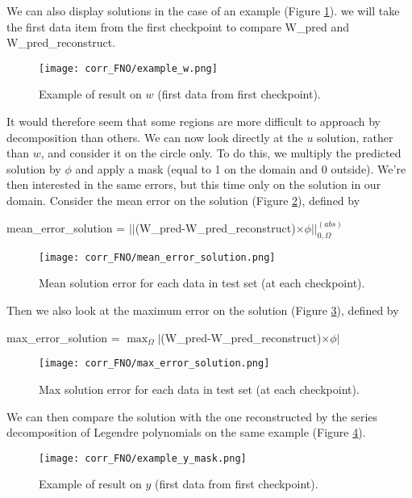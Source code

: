 We can also display solutions in the case of an example (Figure \ref{example_w}). we will take the first data item from the first checkpoint to compare W\_pred and W\_pred\_reconstruct.

\begin{figure}[H]
	\centering
	\texttt{[image: corr\_FNO/example\_w.png]}
	\caption{Example of result on $w$ (first data from first checkpoint).}
	\label{example_w}
\end{figure} 

It would therefore seem that some regions are more difficult to approach by decomposition than others. We can now look directly at the $u$ solution, rather than $w$, and consider it on the circle only. To do this, we multiply the predicted solution by $\phi$ and apply a mask (equal to 1 on the domain and 0 outside). We're then interested in the same errors, but this time only on the solution in our domain. Consider the mean error on the solution (Figure \ref{mean_error_solution}), defined by
\begin{center}
	mean\_error\_solution = $||$(W\_pred-W\_pred\_reconstruct)$\times\phi||_{0,\Omega}^{(abs)}$
\end{center}

\begin{figure}[H]
	\centering
	\texttt{[image: corr\_FNO/mean\_error\_solution.png]}
	\caption{Mean solution error for each data in test set (at each checkpoint).}
	\label{mean_error_solution}
\end{figure} 

Then we also look at the maximum error on the solution (Figure \ref{max_error_solution}), defined by
\begin{center}
	max\_error\_solution = $\max_\Omega|$(W\_pred-W\_pred\_reconstruct)$\times\phi|$
\end{center}

\begin{figure}[H]
	\centering
	\texttt{[image: corr\_FNO/max\_error\_solution.png]}
	\caption{Max solution error for each data in test set (at each checkpoint).}
	\label{max_error_solution}
\end{figure} 

We can then compare the solution with the one reconstructed by the series decomposition of Legendre polynomials on the same example (Figure \ref{example_y_mask}).
\begin{figure}[H]
	\centering
	\texttt{[image: corr\_FNO/example\_y\_mask.png]}
	\caption{Example of result on $y$ (first data from first checkpoint).}
	\label{example_y_mask}
\end{figure} 

